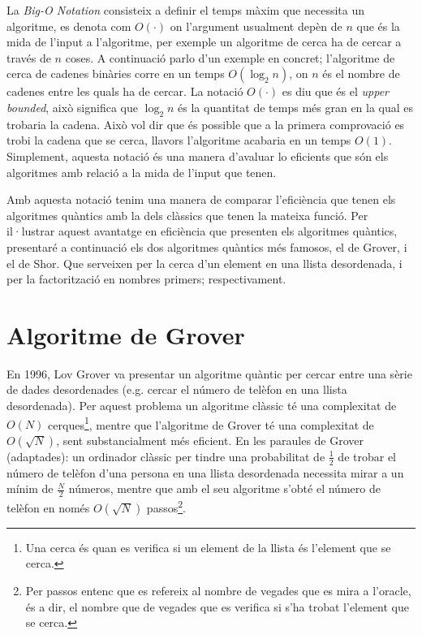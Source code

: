 La \textit{Big-O Notation} consisteix a definir el temps màxim que necessita un algoritme, es denota com $O(\cdot)$ on l'argument usualment depèn de $n$ que és la mida de l'input a l'algoritme, per exemple un algoritme de cerca ha de cercar a través de $n$ coses. A continuació parlo d'un exemple en concret; l'algoritme de cerca de cadenes binàries corre en un temps $O(\log_{2} n)$, on $n$ és el nombre de cadenes entre les quals ha de cercar. La notació $O(\cdot)$ es diu que és el \textit{upper bounded}, això significa que $\log_{2} n$ és la quantitat de temps més gran en la qual es trobaria la cadena. Això vol dir que és possible que a la primera comprovació es trobi la cadena que se cerca, llavors l'algoritme acabaria en un temps $O(1)$. Simplement, aquesta notació és una manera d'avaluar lo eficients que són els algoritmes amb relació a la mida de l'input que tenen.

Amb aquesta notació tenim una manera de comparar l'eficiència que tenen els algoritmes quàntics amb la dels clàssics que tenen la mateixa funció. Per il·lustrar aquest avantatge en eficiència que presenten els algoritmes quàntics, presentaré a continuació els dos algoritmes quàntics més famosos, el de Grover, i el de Shor. Que serveixen per la cerca d'un element en una llista desordenada, i per la factorització en nombres primers; respectivament.

\section{Algoritme de Grover}
En 1996, Lov Grover va presentar un algoritme quàntic per cercar entre una sèrie de dades desordenades \cite{Grover_96} (e.g. cercar el número de telèfon en una llista desordenada). Per aquest problema un algoritme clàssic té una complexitat de $O(N)$ cerques\footnote{Una cerca és quan es verifica si un element de la llista és l'element que se cerca.}, mentre que l'algoritme de Grover té una complexitat de $O(\sqrt{N})$, sent substancialment més eficient. En les paraules de Grover \cite{Grover_96} (adaptades): un ordinador clàssic per tindre una probabilitat de $\frac{1}{2}$ de trobar el número de telèfon d'una persona en una llista desordenada necessita mirar a un mínim de $\frac{N}{2}$ números, mentre que amb el seu algoritme s'obté el número de telèfon en només $O(\sqrt{N})$ passos\footnote{Per passos entenc que es refereix al nombre de vegades que es mira a l'oracle, és a dir, el nombre que de vegades que es verifica si s'ha trobat l'element que se cerca.}.

